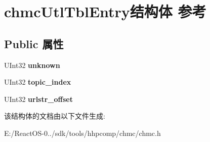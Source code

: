 \hypertarget{structchmc_utl_tbl_entry}{}\section{chmc\+Utl\+Tbl\+Entry结构体 参考}
\label{structchmc_utl_tbl_entry}
\subsection*{Public 属性}
\begin{DoxyCompactItemize}
\item 
\mbox{\label{structchmc_utl_tbl_entry_a423cc6989442aa54edb55d751de082c8}} 
U\+Int32 {\bfseries unknown}
\item 
\mbox{\label{structchmc_utl_tbl_entry_a78da1434b0561e13e85c325a128b6041}} 
U\+Int32 {\bfseries topic\+\_\+index}
\item 
\mbox{\label{structchmc_utl_tbl_entry_a3f4b449c23d375ea2382c14cc07db3b9}} 
U\+Int32 {\bfseries urlstr\+\_\+offset}
\end{DoxyCompactItemize}


该结构体的文档由以下文件生成\+:\begin{DoxyCompactItemize}
\item 
E\+:/\+React\+O\+S-\/0../sdk/tools/hhpcomp/chmc/chmc.\+h\end{DoxyCompactItemize}
